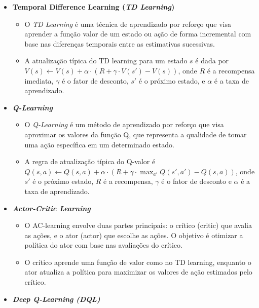\begin{itemize}
	\item \textbf{Temporal Difference Learning (\textit{TD Learning})}
	\begin{itemize}
		\item O \textit{TD Learning} é uma técnica de aprendizado por reforço que visa aprender a função valor de um estado ou ação de forma incremental com base nas diferenças temporais entre as estimativas sucessivas.
		\item A atualização típica do TD learning para um estado \(s\) é dada por \(V(s) \leftarrow V(s) + \alpha \cdot (R + \gamma \cdot V(s') - V(s))\), onde $R$ é a recompensa imediata, \(\gamma\) é o fator de desconto, \(s'\) é o próximo estado, e \(\alpha\) é a taxa de aprendizado.
	\end{itemize}
	
	\item \textbf{\textit{Q-Learning}}
	\begin{itemize}
		\item O \textit{Q-Learning} é um método de aprendizado por reforço que visa aproximar os valores da função Q, que representa a qualidade de tomar uma ação específica em um determinado estado.
		\item A regra de atualização típica do Q-valor é \(Q(s, a) \leftarrow Q(s, a) + \alpha \cdot (R + \gamma \cdot \max_{a'} Q(s', a') - Q(s, a))\), onde \(s'\) é o próximo estado, \(R\) é a recompensa, \(\gamma\) é o fator de desconto e \(\alpha\) é a taxa de aprendizado.
	\end{itemize}
	
	\item \textbf{\textit{Actor-Critic Learning}}
	
	\begin{itemize}
		\item O AC-learning envolve duas partes principais: o crítico (critic) que avalia as ações, e o ator (actor) que escolhe as ações. O objetivo é otimizar a política do ator com base nas avaliações do crítico.
		\item O crítico aprende uma função de valor como no TD learning, enquanto o ator atualiza a política para maximizar os valores de ação estimados pelo crítico.
	\end{itemize}
	
	\item \textbf{\textit{Deep Q-Learning (DQL)}}
	

\end{itemize}
